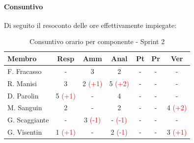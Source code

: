 \documentclass[a4paper,12pt]{article}
\begin{document}
\paragraph{Consuntivo}
Di seguito il resoconto delle ore effettivamente impiegate:

\begin{table}[H]
    \centering
    \renewcommand{\arraystretch}{1.3}
    \small
    \begin{tabularx}{\textwidth}{|l|C|C|C|C|C|C|}
        \hline
        \textbf{Membro} & \textbf{Resp} & \textbf{Amm} & \textbf{Anal} & \textbf{Pt} & \textbf{Pr} & \textbf{Ver} \\
        \hline
        F. Fracasso & - & 3 & 2 & - & - & - \\
        \hline
        R. Manisi & 3 & 2 \textcolor{red}{(+1)} & 5 \textcolor{red}{(+2)} & - & - & - \\
        \hline
        D. Parolin & 5 \textcolor{red}{(+1)} & - & 4 & - & - & - \\
        \hline
        M. Sanguin & 2 & - & 2 & - & - & 4 \textcolor{red}{(+2)} \\
        \hline
        G. Scaggiante & - & 3 \textcolor{red}{(-1)} & - \textcolor{red}{(-1)} & - & - & - \\
        \hline
        G. Visentin & 1 \textcolor{red}{(+1)} & - & 2 \textcolor{red}{(-1)} & - & - & 3 \textcolor{red}{(+1)} \\
        \hline
    \end{tabularx}
    \caption{Consuntivo orario per componente - Sprint 2}
    \label{tab:consuntivo_sprint2}
\end{table}
\end{document}
